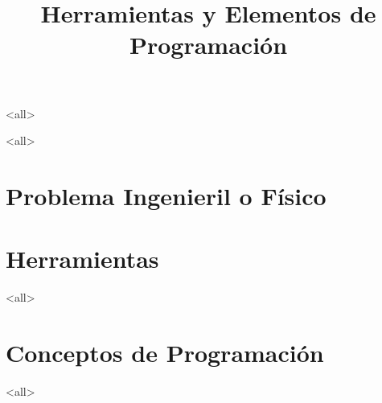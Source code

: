\mode<all>









\title{
    Herramientas y Elementos de Programación}
\subject{Introducción a la Materia. Repaso de elementos de Programación.}





\mode<all>

\section{Problema Ingenieril o Físico}



\section{Herramientas}



\mode<all>
\section{Conceptos de Programación}





\mode<all>





